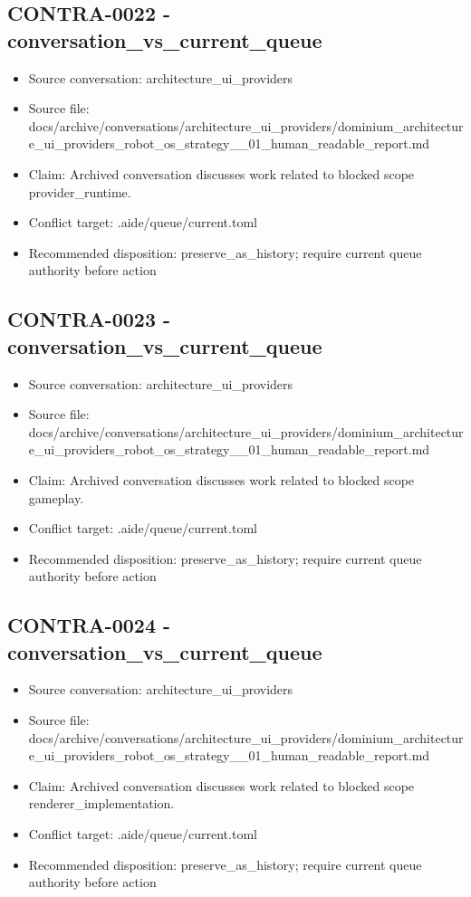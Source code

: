 \documentclass[11pt,a4paper]{report}
\begin{document}
\subsection{CONTRA-0022 - conversation\_vs\_current\_queue}

\begin{itemize}
\item Source conversation: architecture\_ui\_providers
\item Source file: docs/archive/conversations/architecture\_ui\_providers/dominium\_architecture\_ui\_providers\_robot\_os\_strategy\_\_01\_human\_readable\_report.md
\item Claim: Archived conversation discusses work related to blocked scope provider\_runtime.
\item Conflict target: .aide/queue/current.toml
\item Recommended disposition: preserve\_as\_history; require current queue authority before action
\end{itemize}

\subsection{CONTRA-0023 - conversation\_vs\_current\_queue}

\begin{itemize}
\item Source conversation: architecture\_ui\_providers
\item Source file: docs/archive/conversations/architecture\_ui\_providers/dominium\_architecture\_ui\_providers\_robot\_os\_strategy\_\_01\_human\_readable\_report.md
\item Claim: Archived conversation discusses work related to blocked scope gameplay.
\item Conflict target: .aide/queue/current.toml
\item Recommended disposition: preserve\_as\_history; require current queue authority before action
\end{itemize}

\subsection{CONTRA-0024 - conversation\_vs\_current\_queue}

\begin{itemize}
\item Source conversation: architecture\_ui\_providers
\item Source file: docs/archive/conversations/architecture\_ui\_providers/dominium\_architecture\_ui\_providers\_robot\_os\_strategy\_\_01\_human\_readable\_report.md
\item Claim: Archived conversation discusses work related to blocked scope renderer\_implementation.
\item Conflict target: .aide/queue/current.toml
\item Recommended disposition: preserve\_as\_history; require current queue authority before action
\end{itemize}
\end{document}
